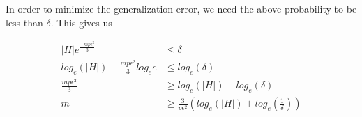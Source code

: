 \begin{enumerate}
In order to minimize the generalization error, we need the above probability to be less than $\delta$. This gives us

\begin{equation*}
\begin{aligned}
\left | H \right | e^{\frac{-mp\epsilon^2}{3}} &\leq \delta\\
log_e \left ( \left | H \right | \right ) - \frac{mp\epsilon^2}{3} log_e e &\leq log_e \left (\delta \right)\\
\frac{mp\epsilon^2}{3} &\geq log_e \left ( \left | H \right | \right ) - log_e \left (\delta \right)\\
m &\geq \frac{3}{p\epsilon^2} \left ( log_e \left ( \left | H \right | \right ) + log_e \left (\frac{1}{\delta} \right) \right )
\end{aligned}
\end{equation*}

\end{enumerate}

